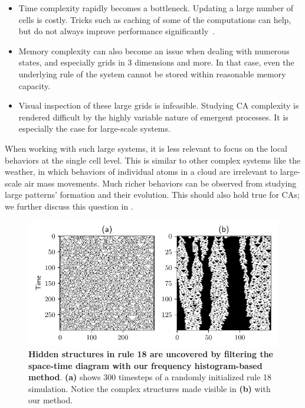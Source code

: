 \begin{itemize}
\item Time complexity rapidly becomes a bottleneck. Updating a large number of
  cells is costly. Tricks such as caching of some of the computations can help,
  but do not always improve performance
  significantly~\cite{gosperExploitingRegularitiesLarge1984}.

\item Memory complexity can also become an issue when dealing with numerous
  states, and especially grids in 3 dimensions and more. In that case, even the
  underlying rule of the system cannot be stored within reasonable memory
  capacity.

\item Visual inspection of these large grids is infeasible. Studying CA
  complexity is rendered difficult by the highly variable nature of emergent
  processes. It is especially the case for large-scale systems.

\end{itemize}
When working with such large systems, it is less relevant to focus on the local
behaviors at the single cell level. This is similar to other complex systems
like the weather, in which behaviors of individual atoms in a cloud are
irrelevant to large-scale air mass movements. Much richer behaviors can be
observed from studying large patterns' formation and their evolution. This
should also hold true for CAs; we further discuss this question in
.

\begin{figure}[th]
  \centering
  \includegraphics[width=.93\linewidth]{figures/rule18_small.pdf}
  \caption{\label{fig:rule18_small} \textbf{Hidden structures in rule 18 are
      uncovered by filtering the space-time diagram with our frequency
      histogram-based method}. \textbf{(a)} shows 300 timesteps of a randomly
    initialized rule 18 simulation. Notice the complex structures made visible
    in \textbf{(b)} with our method.}
\end{figure}

